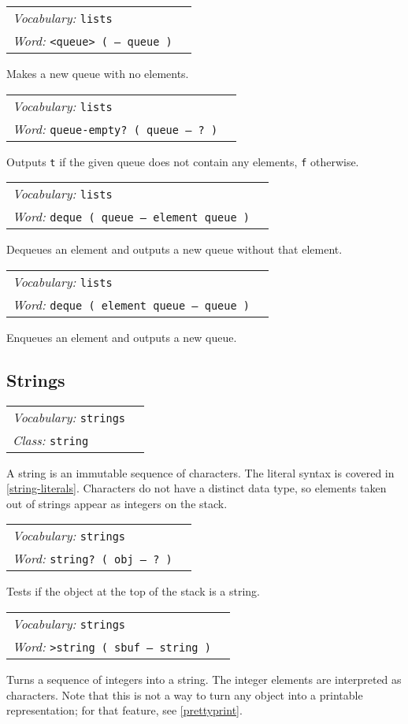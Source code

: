 \documentclass{book}
\newcommand{\vocabulary}[1]{\emph{Vocabulary:} \texttt{#1}&\\}
\newcommand{\ordinaryword}[2]{\index{\texttt{#1}}\emph{Word:} \texttt{#2}&\\}
\newcommand{\classword}[1]{\index{\texttt{#1}}\emph{Class:} \texttt{#1}&\\}
\newcommand{\wordtable}[1]{


\begin{tabularx}{12cm}{lX}
\hline
#1
\hline
\end{tabularx}

}
\begin{document}
\wordtable{
\vocabulary{lists}
\ordinaryword{<queue>}{<queue> ( -- queue )}
}
Makes a new queue with no elements.
\wordtable{
\vocabulary{lists}
\ordinaryword{queue-empty?}{queue-empty? ( queue -- ?~)}
}
Outputs \texttt{t} if the given queue does not contain any elements, \texttt{f} otherwise.
\wordtable{
\vocabulary{lists}
\ordinaryword{deque}{deque ( queue -- element queue )}
}
Dequeues an element and outputs a new queue without that element.
\wordtable{
\vocabulary{lists}
\ordinaryword{enque}{deque ( element queue -- queue )}
}
Enqueues an element and outputs a new queue.

\subsection{\label{strings}Strings}

\stringglos
\wordtable{
\vocabulary{strings}
\classword{string}
}
A string is an immutable sequence of characters. The literal syntax is covered in \ref{string-literals}. Characters do not have a distinct data type, so elements taken out of strings appear as integers on the stack.

\wordtable{
\vocabulary{strings}
\ordinaryword{string?}{string?~( obj -- ?~)}

}
Tests if the object at the top of the stack is a string.

\wordtable{
\vocabulary{strings}
\ordinaryword{>string}{>string~( sbuf -- string )}
}
Turns a sequence of integers into a string. The integer elements are interpreted as characters. Note that this is not a way to turn any object into a printable representation; for that feature, see \ref{prettyprint}.
\end{document}
